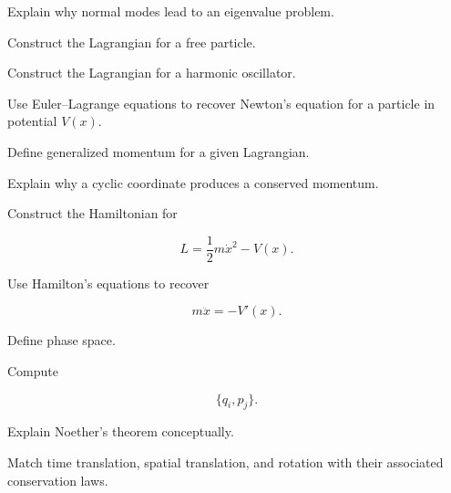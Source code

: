 \begin{exercise}[3]
Explain why normal modes lead to an eigenvalue problem.
\end{exercise}

\begin{exercise}[2]
Construct the Lagrangian for a free particle.
\end{exercise}

\begin{exercise}[2]
Construct the Lagrangian for a harmonic oscillator.
\end{exercise}

\begin{exercise}[3]
Use Euler--Lagrange equations to recover Newton's equation for a particle in
potential \(V(x)\).
\end{exercise}

\begin{exercise}[3]
Define generalized momentum for a given Lagrangian.
\end{exercise}

\begin{exercise}[3]
Explain why a cyclic coordinate produces a conserved momentum.
\end{exercise}

\begin{exercise}[2]
Construct the Hamiltonian for

\[
L
=
\frac12m\dot{x}^2-V(x).
\]
\end{exercise}

\begin{exercise}[3]
Use Hamilton's equations to recover

\[
m\ddot{x}
=
-V'(x).
\]
\end{exercise}

\begin{exercise}[2]
Define phase space.
\end{exercise}

\begin{exercise}[3]
Compute

\[
\{q_i,p_j\}.
\]
\end{exercise}

\begin{exercise}[3]
Explain Noether's theorem conceptually.
\end{exercise}

\begin{exercise}[3]
Match time translation, spatial translation, and rotation with their
associated conservation laws.
\end{exercise}


